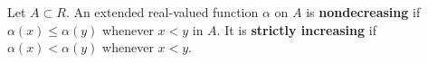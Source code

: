 Let $A \subset R$. An extended real-valued function $\alpha$ on $A$ is \textbf{nondecreasing} if $\alpha(x) \leq \alpha(y)$ whenever $x < y$ in $A$. It is \textbf{strictly increasing} if $\alpha(x) < \alpha(y)$ whenever $x < y$.
